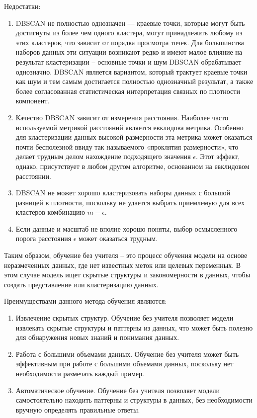 \documentclass[bachelor, och, referat]{SCWorks}
\begin{document}
Недостатки:
\begin{enumerate}
    \item DBSCAN не полностью однозначен — краевые точки, которые могут быть достигнуты из более чем одного кластера, могут принадлежать любому из этих кластеров, что зависит от порядка просмотра точек. Для большинства наборов данных эти ситуации возникают редко и имеют малое влияние на результат кластеризации -- основные точки и шум DBSCAN обрабатывает однозначно. DBSCAN является вариантом, который трактует краевые точки как шум и тем самым достигается полностью однозначный результат, а также более согласованная статистическая интерпретация связных по плотности компонент.
    \item Качество DBSCAN зависит от измерения расстояния. Наиболее часто используемой метрикой расстояний является евклидова метрика. Особенно для кластеризации данных высокой размерности эта метрика может оказаться почти бесполезной ввиду так называемого «проклятия размерности», что делает трудным делом нахождение подходящего значения 
    $\epsilon$. Этот эффект, однако, присутствует в любом другом алгоритме, основанном на евклидовом расстоянии.

    \item DBSCAN не может хорошо кластеризовать наборы данных с большой разницей в плотности, поскольку не удается выбрать приемлемую для всех кластеров комбинацию $m - \epsilon$.
    \item Если данные и масштаб не вполне хорошо поняты, выбор осмысленного порога расстояния 
    $\epsilon$  может оказаться трудным.
\end{enumerate}

\conclusion
Таким образом, обучение без учителя -- это процесс обучения модели на основе неразмеченных данных, где нет известных меток или целевых переменных. В этом случае модель ищет скрытые структуры и закономерности в данных, чтобы создать представление или кластеризацию данных.

Преимуществами данного метода обучения являются:
\begin{enumerate}
    \item Извлечение скрытых структур. Обучение без учителя позволяет модели извлекать скрытые структуры и паттерны из данных, что может быть полезно для обнаружения новых знаний и понимания данных.
    \item Работа с большими объемами данных. Обучение без учителя может быть эффективным при работе с большими объемами данных, поскольку нет необходимости размечать каждый пример.
    \item Автоматическое обучение. Обучение без учителя позволяет модели самостоятельно находить паттерны и структуры в данных, без необходимости вручную определять правильные ответы.
\end{enumerate}
\end{document}
